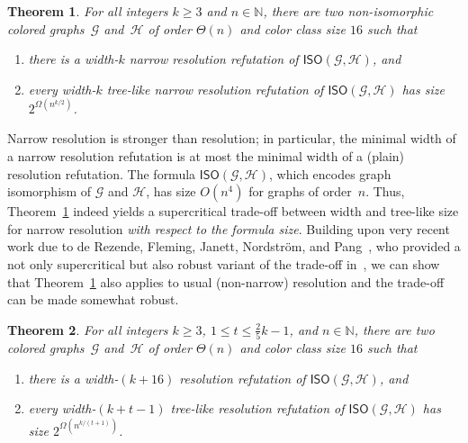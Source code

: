 \documentclass[10pt,a4paper]{article}
\newcommand{\nat}{\mathbb{N}}
\newcommand{\graphG}{\mathcal{G}}
\newcommand{\graphH}{\mathcal{H}}
\newcommand{\ISO}{\mathsf{ISO}(\graphG, \graphH)}
\newtheorem{theorem}{Theorem}
\begin{document}
\begin{theorem}
        \label{thm: lowerbound-treelike-refutation-narrow-width-non-robust}
        For all integers $k \geq 3$ and $n \in \nat$,
        there are two non-isomorphic colored graphs~$\graphG$ and~$\graphH$ of order $\Theta(n)$ and color class size $16$ such that
        \begin{enumerate}
                \item there is a width-$k$ narrow resolution refutation of $\ISO$, and
                \item every width-$k$ tree-like narrow resolution refutation of $\ISO$ has size $2^{\Omega(n^{k/2})}$.
        \end{enumerate}
\end{theorem}

\noindent Narrow resolution is stronger than resolution; in particular, the minimal width of a narrow resolution refutation is
at most the minimal width of a (plain) resolution refutation. The
formula $\ISO$, which encodes graph isomorphism of $\graphG$ and
$\graphH$, has size
%
%
$O(n^4)$
for graphs of order~$n$.
Thus, Theorem~\ref{thm: lowerbound-treelike-refutation-narrow-width-non-robust} indeed
yields a supercritical trade-off between width and tree-like size for narrow resolution \emph{with respect to the formula size}.
Building upon very recent work due to de Rezende, 
                   Fleming, Janett, Nordström, and Pang~\cite{RFJN024}, who provided a not only supercritical but also robust variant of the trade-off in~\cite{DBLP:conf/focs/GroheLNS23}, 
we can show that Theorem~\ref{thm: lowerbound-treelike-refutation-narrow-width-non-robust}
also applies to usual (non-narrow) resolution %
and
the trade-off can be made somewhat robust.


\begin{theorem}
        \label{thm: lowerbound-treelike-refutation-width}
        For all integers $k \geq 3$, $1\leq t \leq \frac{2}{5}k-1$, and $n \in \nat$, there are two colored graphs~$\graphG$ and~$\graphH$
        of order $\Theta(n)$ and color class size $16$
        such that 
        \begin{enumerate}
                \item \label{itm:resolution-refutable} there is a width-$(k+16)$ resolution refutation of $\ISO$, and
                \item \label{itm:resolution-robust} every width-$(k+t-1)$ tree-like resolution refutation of $\ISO$ has size $2^{\Omega(n^{k/(t+1)})}$.
        \end{enumerate}
\end{theorem}
\end{document}
